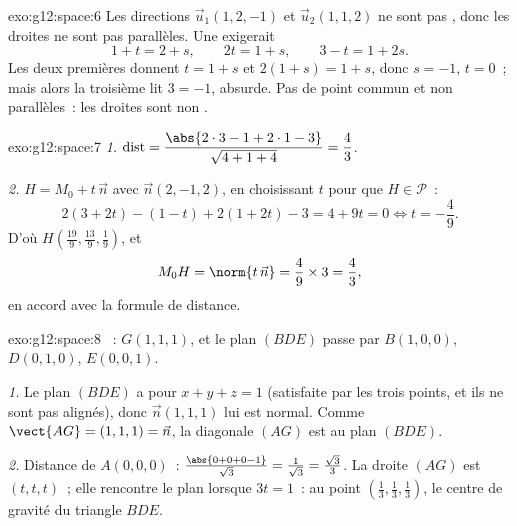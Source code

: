 \begin{solution}{exo:g12:space:6}
Les directions $\vec u_1(1, 2, -1)$ et $\vec u_2(1, 1, 2)$ ne sont pas
, donc les droites ne sont pas parallèles. Une 
exigerait
\[
1 + t = 2 + s, \qquad 2t = 1 + s, \qquad 3 - t = 1 + 2s .
\]
Les deux premières donnent $t = 1 + s$ et $2(1+s) = 1 + s$, donc
$s = -1$, $t = 0$~; mais alors la troisième lit $3 = -1$, absurde. Pas de
point commun et non parallèles~: les droites sont non .
\end{solution}

\begin{solution}{exo:g12:space:7}
\emph{1.} $\operatorname{dist} = \dfrac{\abs{2\cdot3 - 1 + 2\cdot1 - 3}}
{\sqrt{4 + 1 + 4}} = \dfrac{4}{3}$.

\emph{2.} $H = M_0 + t\,\vec n$ avec $\vec n(2, -1, 2)$, en choisissant
$t$ pour que $H \in \mathcal P$~:
\[
2(3 + 2t) - (1 - t) + 2(1 + 2t) - 3 = 4 + 9t = 0 \iff t = -\frac49 .
\]
D'où $H\left(\frac{19}{9}, \frac{13}{9}, \frac19\right)$, et
\[
M_0H = \norm{t\,\vec n} = \frac49 \times 3 = \frac43,
\]
en accord avec la formule de distance.
\end{solution}

\begin{solution}{exo:g12:space:8}
~: $G(1,1,1)$, et le plan $(BDE)$ passe par $B(1,0,0)$,
$D(0,1,0)$, $E(0,0,1)$.

\emph{1.} Le plan $(BDE)$ a pour  $x + y + z = 1$ (satisfaite par
les trois points, et ils ne sont pas alignés), donc $\vec n(1,1,1)$ lui
est normal. Comme $\vect{AG} = (1,1,1) = \vec n$, la diagonale $(AG)$ est
 au plan $(BDE)$.

\emph{2.} Distance de $A(0,0,0)$~:
$\frac{\abs{0 + 0 + 0 - 1}}{\sqrt3} = \frac{1}{\sqrt3} = \frac{\sqrt3}{3}$.
La droite $(AG)$ est $(t, t, t)$~; elle rencontre le plan lorsque
$3t = 1$~: au point $\left(\frac13, \frac13, \frac13\right)$, le
centre de gravité du triangle $BDE$.
\end{solution}

